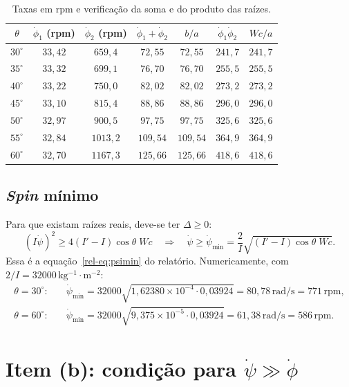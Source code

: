 \documentclass[11pt,a4paper]{article}
\newcommand{\un}[1]{\,\mathrm{#1}}
\newcommand{\phid}{\dot{\phi}}
\newcommand{\psid}{\dot{\psi}}
\begin{document}
\begin{table}[H]
\centering\small
\caption{Taxas em rpm e verificação da soma e do produto das raízes.}
\label{m:tab:rpm}
\begin{tabular}{ccccccc}
\toprule
$\theta$ & $\phid_1$ (rpm) & $\phid_2$ (rpm) & $\phid_1+\phid_2$ & $b/a$ & $\phid_1\phid_2$ & $Wc/a$\\
\midrule
$30^\circ$ & $33,42$ & $659,4$ & $72,55$ & $72,55$ & $241,7$ & $241,7$\\
$35^\circ$ & $33,32$ & $699,1$ & $76,70$ & $76,70$ & $255,5$ & $255,5$\\
$40^\circ$ & $33,22$ & $750,0$ & $82,02$ & $82,02$ & $273,2$ & $273,2$\\
$45^\circ$ & $33,10$ & $815,4$ & $88,86$ & $88,86$ & $296,0$ & $296,0$\\
$50^\circ$ & $32,97$ & $900,5$ & $97,75$ & $97,75$ & $325,6$ & $325,6$\\
$55^\circ$ & $32,84$ & $1013,2$ & $109,54$ & $109,54$ & $364,9$ & $364,9$\\
$60^\circ$ & $32,70$ & $1167,3$ & $125,66$ & $125,66$ & $418,6$ & $418,6$\\
\bottomrule
\end{tabular}
\end{table}

\subsection{\textit{Spin} mínimo}

Para que existam raízes reais, deve-se ter $\Delta\geq0$:
\begin{equation}
\left(I\psid\right)^2\geq4(I'-I)\cos\theta\;Wc
\quad\Longrightarrow\quad
\psid\geq\psid_{\mathrm{min}}=\frac{2}{I}\sqrt{(I'-I)\cos\theta\;Wc}.
\end{equation}
Essa é a equação~\ref*{rel-eq:psimin} do relatório. Numericamente, com $2/I=32000\un{kg^{-1}\cdot m^{-2}}$:
\begin{align}
\theta=30^\circ:&\quad\psid_{\mathrm{min}}=32000\sqrt{1,62380\times10^{-4}\cdot0,03924}=80,78\un{rad/s}=771\un{rpm},\\
\theta=60^\circ:&\quad\psid_{\mathrm{min}}=32000\sqrt{9,375\times10^{-5}\cdot0,03924}=61,38\un{rad/s}=586\un{rpm}.
\end{align}

\section{Item (b): condição para $\psid\gg\phid$}
\end{document}
